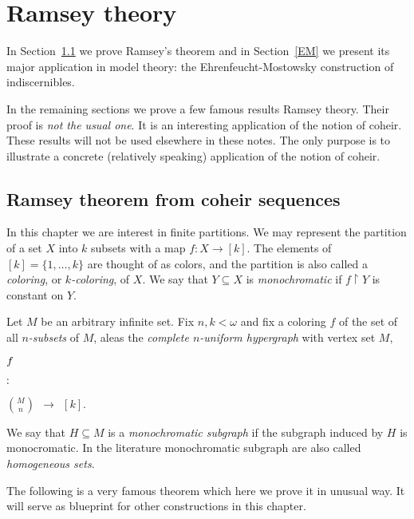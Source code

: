 \documentclass[creche.tex]{subfiles}
\begin{document}
\chapter{Ramsey theory}
\label{ramsey}

In Section~\ref{Ramsey} we prove Ramsey's theorem and in Section~\ref{EM} we present its major application in model theory: 
the Ehrenfeucht-Mostowsky construction of indiscernibles.

In the remaining sections we prove a few famous results Ramsey theory. 
Their proof is \textit{not the usual one}. 
It is an interesting application of the notion of coheir.
These results will not be used elsewhere in these notes.
The only purpose is to illustrate a concrete (relatively speaking) application of the notion of coheir.

\def\medrel#1{\parbox[t]{6ex}{$\displaystyle\hfil #1$}}
\def\ceq#1#2#3{\parbox[t]{12ex}{$\displaystyle #1$}\medrel{#2}{$\displaystyle #3$}}



\section{Ramsey theorem from coheir sequences}
\label{Ramsey}

In this chapter we are interest in finite partitions.
We may represent the partition of a set $X$ into $k$ subsets with a map $f:X\to [k]$.
The elements of $[k]=\{1,\dots,k\}$ are thought of as colors,
and the partition is also called a \emph{coloring},
or \emph{$k$-coloring}, of $X$.
We say that $Y\subseteq X$ is \emph{monochromatic\/} if $f\restriction Y$ is constant on $Y$.

Let $M$ be an arbitrary infinite set.
Fix $n,k<\omega$ and fix a coloring $f$ of the set of all \emph{$n$-subsets} of $M$,
aleas the \emph{complete $n$-uniform hypergraph\/} with vertex set $M$,

\ceq{\hfill f}{:}{ {M\choose n}\ \ \to\ \ [k]}.

We say that $H\subseteq M$ is a \emph{monochromatic subgraph\/} if the subgraph induced by $H$ is monocromatic.
In the literature monochromatic subgraph are also called \emph{homogeneous sets}.

The following is a very famous theorem which here we prove it in unusual way.
It will serve as blueprint for other constructions in this chapter.
\end{document}
